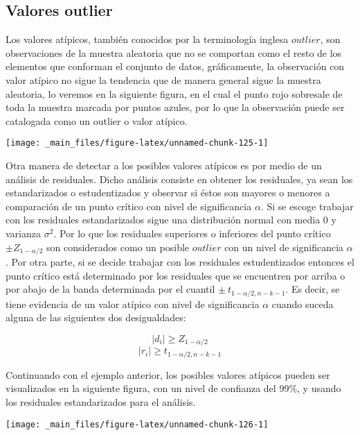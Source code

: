 \documentclass[
  a4paper,
  oneside,
  openany]{book}
\begin{document}
\hypertarget{valores-outlier}{%
\subsection{Valores outlier}\label{valores-outlier}}

Los valores atípicos, también conocidos por la terminología inglesa \(outlier\), son observaciones de la muestra aleatoria que no se comportan como el resto de los elementos que conforman el conjunto de datos, gráficamente, la observación con valor atípico no sigue la tendencia que de manera general sigue la muestra aleatoria, lo veremos en la siguiente figura, en el cual el punto rojo sobresale de toda la muestra marcada por puntos azules, por lo que la observación puede ser catalogada como un outlier o valor atípico.

\begin{center}\texttt{[image: \_main\_files/figure-latex/unnamed-chunk-125-1]} \end{center}

Otra manera de detectar a los posibles valores atípicos es por medio de un análisis de residuales. Dicho análisis consiste en obtener los residuales, ya sean los estandarizados o estudentizados y observar si éstos son mayores o menores a comparación de un punto crítico con nivel de significancia \(\alpha\). Si se escoge trabajar con los residuales estandarizados sigue una distribución normal con media 0 y varianza \(\sigma^2\). Por lo que los residuales superiores o inferiores del punto crítico \(\pm Z_{1-\alpha/2}\) son considerados como un posible \(outlier\) con un nivel de significancia \(\alpha\). Por otra parte, si se decide trabajar con los residuales estudentizados entonces el punto crítico está determinado por los residuales que se encuentren por arriba o por abajo de la banda determinada por el cuantil \(\pm \ t_{1-\alpha/2,n-k-1}.\) Es decir, se tiene evidencia de un valor atípico con nivel de significancia \(\alpha\) cuando suceda alguna de las siguientes dos desigualdades:

\[\mid d_{i} \mid \geq Z_{1-\alpha/2}\]
\[\mid r_{i}\mid  \geq t_{1-\alpha/2,n-k-1}\]

Continuando con el ejemplo anterior, los posibles valores atípicos pueden ser visualizados en la siguiente figura, con un nivel de confianza del 99\%, y usando los residuales estandarizados para el análisis.

\begin{center}\texttt{[image: \_main\_files/figure-latex/unnamed-chunk-126-1]} \end{center}
\end{document}
